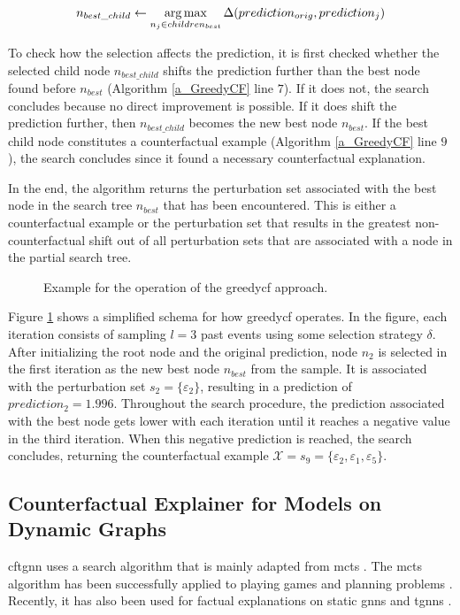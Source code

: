 \begin{equation}
    n_{best\_child} \gets \operatorname*{arg\,max}_{n_j \in children_{best}} \Delta(prediction_{orig}, prediction_j)
\end{equation}

To check how the selection affects the prediction, it is first checked whether the selected child node $n_{best\_child}$ shifts the prediction further than the best node found before $n_{best}$ (Algorithm \ref{a_GreedyCF} line $7$). If it does not, the search concludes because no direct improvement is possible. If it does shift the prediction further, then $n_{best\_child}$ becomes the new best node $n_{best}$. If the best child node constitutes a counterfactual example (Algorithm \ref{a_GreedyCF} line $9$), the search concludes since it found a necessary counterfactual explanation.

In the end, the algorithm returns the perturbation set associated with the best node in the search tree $n_{best}$ that has been encountered. This is either a counterfactual example or the perturbation set that results in the greatest non-counterfactual shift out of all perturbation sets that are associated with a node in the partial search tree.

\FloatBarrier
\begin{figure}[ht]
    \centering
    
    \caption{Example for the operation of the \gls{greedycf} approach.}
    \label{f_GreedyBaseline}
\end{figure}


Figure \ref{f_GreedyBaseline} shows a simplified schema for how \gls{greedycf} operates. In the figure, each iteration consists of sampling $l = 3$ past events using some selection strategy $\delta$. After initializing the root node and the original prediction, node $n_2$ is selected in the first iteration as the new best node $n_{best}$ from the sample. It is associated with the perturbation set $s_2 = \{\varepsilon_2\}$, resulting in a prediction of $prediction_2 = 1.996$. Throughout the search procedure, the prediction associated with the best node gets lower with each iteration until it reaches a negative value in the third iteration. When this negative prediction is reached, the search concludes, returning the counterfactual example $\mathcal{X} = s_9 = \{\varepsilon_2, \varepsilon_1, \varepsilon_5\}$.


\FloatBarrier
\subsection{Counterfactual Explainer for Models on Dynamic Graphs}
\label{s_Methodology_CoDy}
\acrfull{cftgnn} uses a search algorithm that is mainly adapted from \gls{mcts} \cite{kocsis_bandit_2006, silver_mastering_2017}. The \gls{mcts} algorithm has been successfully applied to playing games \cite{silver_mastering_2017} and planning problems \cite{browne_survey_2012}. Recently, it has also been used for factual explanations on static \glspl{gnn} \cite{yuan_explainability_2021, zhang_gstarx_2022} and \glspl{tgnn} \cite{xia_explaining_2023}. 

